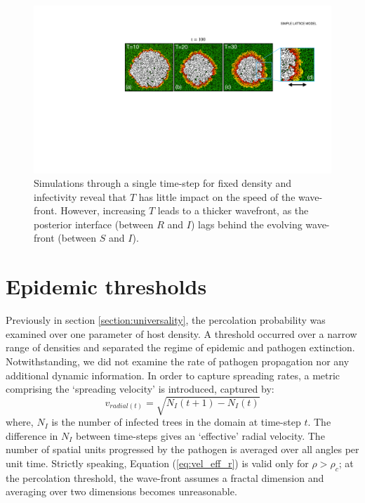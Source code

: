 \begin{figure}
    \centering
    \includegraphics[scale=0.35]{chapter3/figures/figure5_.pdf}
    \caption{Simulations through a single time-step for fixed density and infectivity reveal that $T$ has little impact on the speed of the wave-front. 
    However, increasing $T$ leads to a thicker wavefront, as the posterior interface (between $R$ and $I$) lags behind the evolving wave-front (between $S$ and $I$).}
    \label{fig:slm-wave-front}
\end{figure}

\newpage

\section{Epidemic thresholds}
\label{sec:SLM-epidemic-threshold}

Previously in section \ref{section:universality}, the percolation probability was examined over one parameter of host density.
A threshold occurred over a narrow range of densities and separated the regime of epidemic and pathogen extinction.
Notwithstanding, we did not examine the rate of pathogen propagation nor any additional dynamic information.
In order to capture spreading rates, a metric comprising the `spreading velocity' is introduced, captured by: 
\begin{equation}
\label{eq:vel_eff_r}
    v_{radial(t)}=\sqrt{N_I(t+1)-N_I(t)}
\end{equation} 
where, $N_I$ is the number of infected trees in the domain at time-step $t$. 
The difference in $N_I$ between time-steps gives an `effective' radial velocity. %
The number of spatial units progressed by the pathogen is averaged over all angles per unit time. %
Strictly speaking, Equation (\ref{eq:vel_eff_r}) is valid only for $\rho > \rho_c$; at the percolation threshold, the wave-front assumes a fractal dimension and averaging over two dimensions becomes unreasonable.

